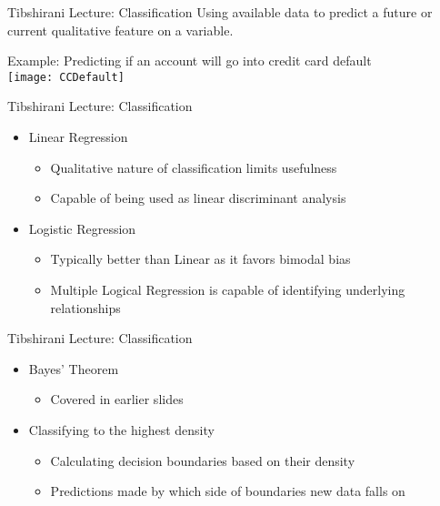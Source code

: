 \documentclass{beamer}
\begin{document}
\begin{frame}{Tibshirani Lecture: Classification}
	Using available data to predict a future or current qualitative feature on a variable. \\
	\begin{block}{Example:}
		Predicting if an account will go into credit card default \\
		\vspace{1em}
		\centering 
		\texttt{[image: CCDefault]}
		\vspace{1em}
	\end{block}
\end{frame}

\begin{frame}{Tibshirani Lecture: Classification}
	\begin{itemize}
		\item<1-> Linear Regression
		\begin{itemize}
			\item<1-> Qualitative nature of classification limits usefulness
			\item<1-> Capable of being used as linear discriminant analysis
		\end{itemize}
		\item<2-> Logistic Regression
		\begin{itemize}
			\item<2-> Typically better than Linear as it favors bimodal bias
			\item<2-> Multiple Logical Regression is capable of identifying underlying relationships
		\end{itemize}
	\end{itemize}
\end{frame}

\begin{frame}{Tibshirani Lecture: Classification}
\begin{itemize}
	\item<1-> Bayes' Theorem
	\begin{itemize}
		\item<1-> Covered in earlier slides
	\end{itemize}
	\item<2-> Classifying to the highest density
	\begin{itemize}
		\item<2-> Calculating decision boundaries based on their density
		\item<2-> Predictions made by which side of boundaries new data falls on
	\end{itemize}
\end{itemize}
\end{frame}
\end{document}
